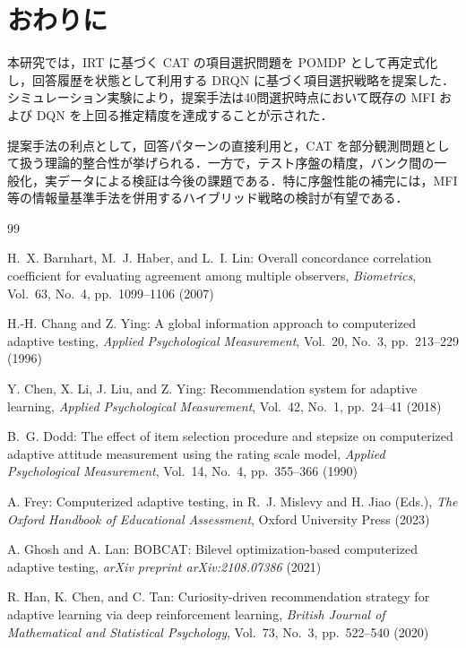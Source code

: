 \documentclass[dvipdfmx,a4j]{jarticle}
\begin{document}
\section{おわりに}

本研究では，IRT に基づく CAT の項目選択問題を POMDP として再定式化し，回答履歴を状態として利用する DRQN に基づく項目選択戦略を提案した．シミュレーション実験により，提案手法は40問選択時点において既存の MFI および DQN を上回る推定精度を達成することが示された．

提案手法の利点として，回答パターンの直接利用と，CAT を部分観測問題として扱う理論的整合性が挙げられる．一方で，テスト序盤の精度，バンク間の一般化，実データによる検証は今後の課題である．特に序盤性能の補完には，MFI 等の情報量基準手法を併用するハイブリッド戦略の検討が有望である．

\begin{thebibliography}{99}

H.~X. Barnhart, M.~J. Haber, and L.~I. Lin:
Overall concordance correlation coefficient for evaluating agreement among multiple observers,
\textit{Biometrics}, Vol.~63, No.~4, pp.~1099--1106 (2007)

H.-H. Chang and Z. Ying:
A global information approach to computerized adaptive testing,
\textit{Applied Psychological Measurement}, Vol.~20, No.~3, pp.~213--229 (1996)

Y. Chen, X. Li, J. Liu, and Z. Ying:
Recommendation system for adaptive learning,
\textit{Applied Psychological Measurement}, Vol.~42, No.~1, pp.~24--41 (2018)

B.~G. Dodd:
The effect of item selection procedure and stepsize on computerized adaptive attitude measurement using the rating scale model,
\textit{Applied Psychological Measurement}, Vol.~14, No.~4, pp.~355--366 (1990)

A. Frey:
Computerized adaptive testing,
in R.~J. Mislevy and H. Jiao (Eds.),
\textit{The Oxford Handbook of Educational Assessment},
Oxford University Press (2023)

A. Ghosh and A. Lan:
BOBCAT: Bilevel optimization-based computerized adaptive testing,
\textit{arXiv preprint arXiv:2108.07386} (2021)

R. Han, K. Chen, and C. Tan:
Curiosity-driven recommendation strategy for adaptive learning via deep reinforcement learning,
\textit{British Journal of Mathematical and Statistical Psychology},
Vol.~73, No.~3, pp.~522--540 (2020)


\end{thebibliography}
\end{document}
